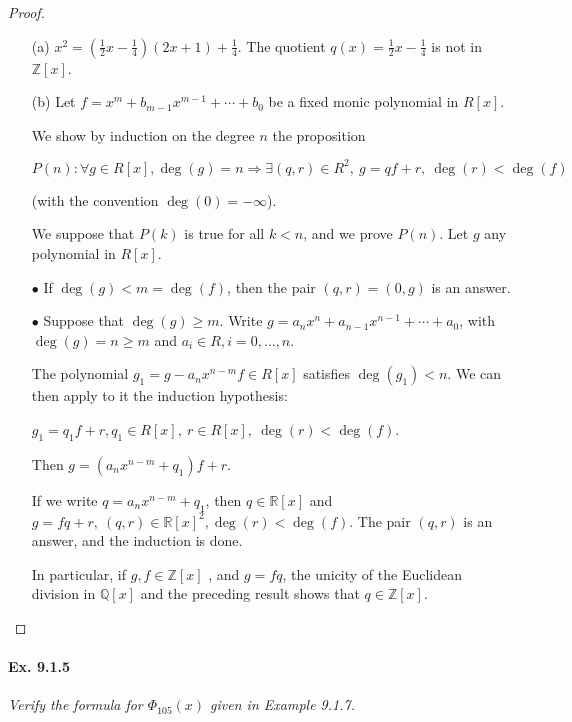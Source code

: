 \documentclass[11pt,a4paper]{article}
\newcommand{\Z}{\mathbb{Z}}
\begin{document}
\begin{proof}
\begin{enumerate}
\item[(a)]
$x^2 = (\frac{1}{2}x - \frac{1}{4})(2x+1)+\frac{1}{4}$.
The quotient $q(x) = \frac{1}{2}x - \frac{1}{4}$ is not in $\Z[x]$.

\item[(b)]
Let $f = x^m + b_{m-1}x^{m-1}+ \cdots+b_0$ be a fixed monic polynomial in  $R[x]$.

We show by induction on the degree $n$ the proposition

$P(n) : \forall g \in R[x], \deg(g) = n \Rightarrow \exists (q,r) \in R^2, \ g = qf+r,\  \deg(r) < \deg(f)$

(with the convention $\deg(0) = -\infty$).

We suppose that $P(k)$ is true for all $k<n$, and we prove $P(n)$. Let $g$ any polynomial in $R[x]$.

$\bullet$ If $\deg(g) < m = \deg(f)$, then the pair $(q,r) = (0,g)$ is an answer.

$\bullet$ Suppose that $\deg(g) \geq m$.  Write $g = a_n x^n+ a_{n-1}x^{n-1}+ \cdots +a_0$, with $\deg(g) = n \geq m$ and $a_i \in R, i=0,\ldots,n$.

The polynomial $g_1 = g - a_n x^{n-m} f \in R[x]$ satisfies $\deg(g_1) < n$. We can then apply to it the induction hypothesis:

$g_1 =  q_1 f+r, q_1 \in R[x],\ r \in R[x],\ \deg(r) < \deg(f)$.

Then $g = (a_n x^{n-m} + q_1) f+ r$.

If we write $q = a_n x^{n-m} + q_1$, then $q \in \mathbb{R}[x]$ and $g = fq+r,\ (q,r) \in\mathbb{R}[x]^2, \deg(r) < \deg(f)$. The pair $(q,r)$ is an answer, and the induction is done.

In particular, if $g,f \in \mathbb{Z}[x]$ , and $g = f q$, the unicity of the Euclidean division in $\mathbb{Q}[x]$ and the preceding result shows that $q \in \mathbb{Z}[x]$.

\end{enumerate}
\end{proof}

\paragraph{Ex. 9.1.5}

{\it Verify the formula for $\Phi_{105}(x)$ given in Example 9.1.7.
}
\end{document}
